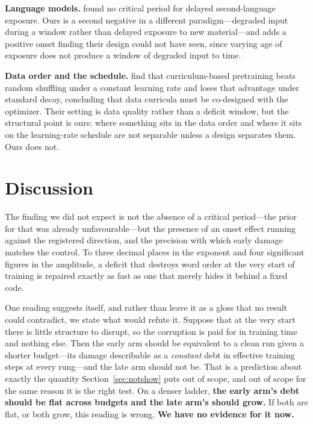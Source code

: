 \documentclass[11pt]{article}
\begin{document}
\textbf{Language models.} \citet{constantinescu2025investigating} found no
critical period for delayed second-language exposure. Ours is a second negative in
a different paradigm---degraded input during a window rather than delayed exposure
to new material---and adds a positive onset finding their design could not have
seen, since varying age of exposure does not produce a window of degraded input to
time.

\textbf{Data order and the schedule.} \citet{luo2025learning} find that
curriculum-based pretraining beats random shuffling under a constant learning rate
and loses that advantage under standard decay, concluding that data curricula must
be co-designed with the optimizer. Their setting is data quality rather than a
deficit window, but the structural point is ours: where something sits in the data
order and where it sits on the learning-rate schedule are not separable unless a
design separates them. Ours does not.

\section{Discussion}

The finding we did not expect is not the absence of a critical period---the prior
for that was already unfavourable---but the presence of an onset effect running
against the registered direction, and the precision with which early damage
matches the control. To three decimal places in the exponent and four significant
figures in the amplitude, a deficit that destroys word order at the very start of
training is repaired exactly as fast as one that merely hides it behind a fixed
code.

One reading suggests itself, and rather than leave it as a gloss that no result
could contradict, we state what would refute it. Suppose that at the very start
there is little structure to disrupt, so the corruption is paid for in training
time and nothing else. Then the early arm should be equivalent to a clean run
given a shorter budget---its damage describable as a \emph{constant} debt in
effective training steps at every rung---and the late arm should not be. That is a
prediction about exactly the quantity Section~\ref{sec:notshow} puts out of scope,
and out of scope for the same reason it is the right test. On a denser ladder,
\textbf{the early arm's debt should be flat across budgets and the late arm's
should grow.} If both are flat, or both grow, this reading is wrong.
\textbf{We have no evidence for it now.}
\end{document}
